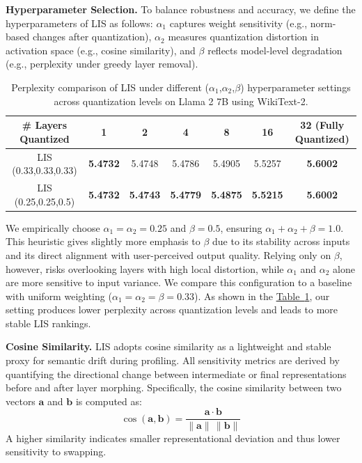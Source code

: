 \noindent\textbf{Hyperparameter Selection.}
To balance robustness and accuracy, we define the hyperparameters of LIS as follows:
{$\alpha_1$} captures weight sensitivity (e.g., norm-based changes after quantization), {$\alpha_2$} measures quantization distortion in activation space (e.g., cosine similarity), and {$\beta$} reflects model-level degradation (e.g., perplexity under greedy layer removal).

\begin{table}[h]
\caption{Perplexity comparison of LIS under different ($\alpha_1$,$\alpha_2$,$\beta$) hyperparameter settings across quantization levels on Llama 2 7B using WikiText-2.}
\label{table:perp_comp_lis}
\centering
\begin{tabular}{|c|c|c|c|c|c|c|}
\hline
\# Layers Quantized & 1 & 2 & 4 & 8 & 16 & 32 (Fully Quantized) \\ \hline
LIS (0.33,0.33,0.33) & \textbf{5.4732} & 5.4748 & 5.4786 & 5.4905 & 5.5257 & \textbf{5.6002} \\ \hline
LIS (0.25,0.25,0.5) & \textbf{5.4732} & \textbf{5.4743} & \textbf{5.4779} & \textbf{5.4875} & \textbf{5.5215} & \textbf{5.6002} \\ \hline
\end{tabular}
\end{table}

We empirically choose $\alpha_1=\alpha_2=0.25$ and $\beta=0.5$, ensuring $\alpha_1 + \alpha_2 + \beta = 1.0$. This heuristic gives slightly more emphasis to {$\beta$} due to its stability across inputs and its direct alignment with user-perceived output quality. Relying only on {$\beta$}, however, risks overlooking layers with high local distortion, while {$\alpha_1$} and {$\alpha_2$} alone are more sensitive to input variance.
We compare this configuration to a baseline with uniform weighting ($\alpha_1=\alpha_2= \beta = 0.33$). As shown in the \hyperref[table:perp_comp_lis]{Table~\ref{table:perp_comp_lis}}, our setting produces lower perplexity across quantization levels and leads to more stable LIS rankings.

\noindent\textbf{Cosine Similarity.}  
LIS adopts cosine similarity as a lightweight and stable proxy for semantic drift during profiling. All sensitivity metrics are derived by quantifying the directional change between intermediate or final representations before and after layer morphing. Specifically, the cosine similarity between two vectors $\mathbf{a}$ and $\mathbf{b}$ is computed as: \vspace{-5pt}
\begin{equation}
\cos(\mathbf{a}, \mathbf{b}) = \frac{\mathbf{a} \cdot \mathbf{b}}{\|\mathbf{a}\| \, \|\mathbf{b}\|}
\label{eq:cosine}
\end{equation}
A higher similarity indicates smaller representational deviation and thus lower sensitivity to swapping.

